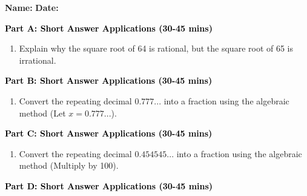 \documentclass[12pt, letterpaper, fleqn]{article}
\begin{document}
\textbf{Name:} \underline{\hspace{5cm}}
\hfill
\textbf{Date:} \underline{\hspace{3cm}}\\


\begin{tcolorbox}[colback=customteal!20]
\large\textcolor{black}{\textbf{Part A: Short Answer Applications (30-45 mins)}}
\end{tcolorbox}

\vspace{3mm}

\begin{enumerate}[itemsep=4.2cm, leftmargin=0.6cm]
\item Explain why the square root of 64 is rational, but the square root of 65 is irrational.
\end{enumerate}

\newpage

\begin{tcolorbox}[colback=customteal!20]
\large\textcolor{black}{\textbf{Part B: Short Answer Applications (30-45 mins)}}
\end{tcolorbox}

\vspace{3mm}

\begin{enumerate}[itemsep=4.2cm, leftmargin=0.6cm, resume]
\item Convert the repeating decimal $0.777...$ into a fraction using the algebraic method (Let $x = 0.777...$).
\end{enumerate}

\newpage

\begin{tcolorbox}[colback=customteal!20]
\large\textcolor{black}{\textbf{Part C: Short Answer Applications (30-45 mins)}}
\end{tcolorbox}

\vspace{3mm}

\begin{enumerate}[itemsep=4.2cm, leftmargin=0.6cm, resume]
\item Convert the repeating decimal $0.454545...$ into a fraction using the algebraic method (Multiply by 100).
\end{enumerate}

\newpage

\begin{tcolorbox}[colback=customteal!20]
\large\textcolor{black}{\textbf{Part D: Short Answer Applications (30-45 mins)}}
\end{tcolorbox}
\end{document}
